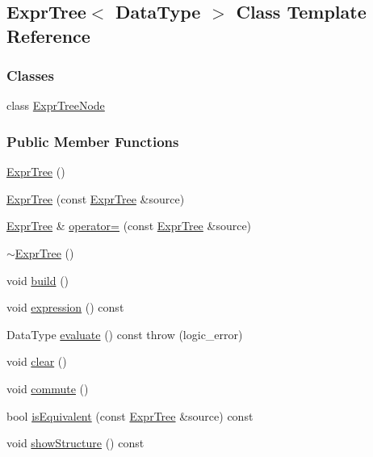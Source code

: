 \hypertarget{class_expr_tree}{}\subsection{Expr\+Tree$<$ Data\+Type $>$ Class Template Reference}
\label{class_expr_tree}
\subsubsection*{Classes}
\begin{DoxyCompactItemize}
\item 
class \hyperlink{class_expr_tree_1_1_expr_tree_node}{Expr\+Tree\+Node}
\end{DoxyCompactItemize}
\subsubsection*{Public Member Functions}
\begin{DoxyCompactItemize}
\item 
\hyperlink{class_expr_tree_a1d5004443b461637bcb0fe0a86759d50}{Expr\+Tree} ()
\item 
\hyperlink{class_expr_tree_aeec9dc6139cf32fcc911840bab438239}{Expr\+Tree} (const \hyperlink{class_expr_tree}{Expr\+Tree} \&source)
\item 
\hyperlink{class_expr_tree}{Expr\+Tree} \& \hyperlink{class_expr_tree_a9a7b2120af2c2df666b1154eec20008a}{operator=} (const \hyperlink{class_expr_tree}{Expr\+Tree} \&source)
\item 
\hyperlink{class_expr_tree_a8976e9af7e1209b9db475b863ab9f31d}{$\sim$\+Expr\+Tree} ()
\item 
void \hyperlink{class_expr_tree_a283a61049eb163f6f370d562cc92c824}{build} ()
\item 
void \hyperlink{class_expr_tree_ac367645dc4ccaf488e121cd5a0a8c07d}{expression} () const 
\item 
Data\+Type \hyperlink{class_expr_tree_ad1579e64d55cdfcd500a634ef69ed792}{evaluate} () const   throw (logic\+\_\+error)
\item 
void \hyperlink{class_expr_tree_a87d6593a3ad6199b5521f6d1e3ba851f}{clear} ()
\item 
void \hyperlink{class_expr_tree_a8bfcf0da6dfd93f4228a35cded704fb4}{commute} ()
\item 
bool \hyperlink{class_expr_tree_ae64a4e3b5008fa2f533fd7461ead2485}{is\+Equivalent} (const \hyperlink{class_expr_tree}{Expr\+Tree} \&source) const 
\item 
void \hyperlink{class_expr_tree_a6f4c5e2ae8224fb53fb893231814e6d9}{show\+Structure} () const 
\end{DoxyCompactItemize}
